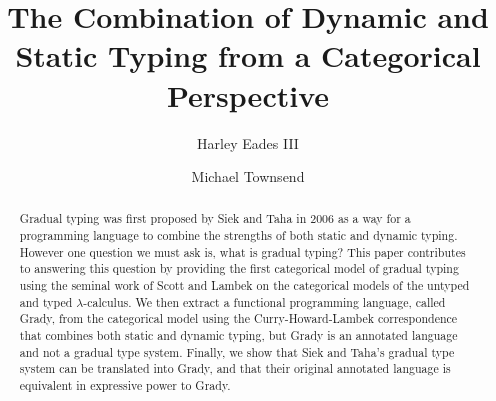 \documentclass[pacmpl,review,anonymous]{acmart}\settopmatter{printfolios=true}
\begin{document}
\title[Combining Dynamic and Static Typing: A Categorical Perspective]{The Combination of Dynamic and Static Typing from a Categorical Perspective}


\author{Harley Eades III}

\author{Michael Townsend}

\begin{abstract}
  Gradual typing was first proposed by Siek and Taha in 2006 as a way
  for a programming language to combine the strengths of both static
  and dynamic typing.  However one question we must ask is, what is
  gradual typing?  This paper contributes to answering this question
  by providing the first categorical model of gradual typing using the
  seminal work of Scott and Lambek on the categorical models of the
  untyped and typed $\lambda$-calculus.  We then extract a functional
  programming language, called Grady, from the categorical model using
  the Curry-Howard-Lambek correspondence that combines both static and
  dynamic typing, but Grady is an annotated language and not a gradual
  type system.  Finally, we show that Siek and Taha's gradual type
  system can be translated into Grady, and that their original
  annotated language is equivalent in expressive power to Grady.
\end{abstract}
\end{document}
